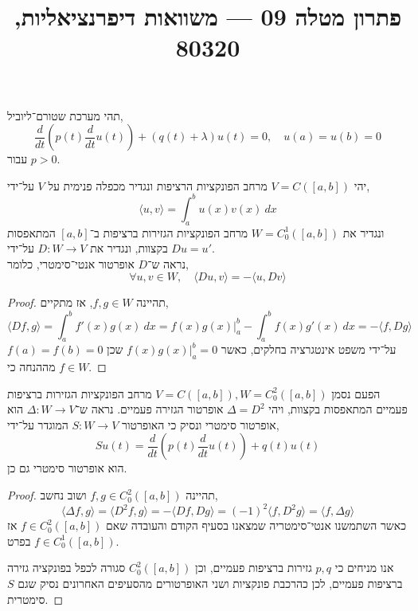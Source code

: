  \title{פתרון מטלה 09 --- משוואות דיפרנציאליות, 80320}

\DeclareMathOperator\Div{div}

\usepackage{pgfplots, tikz, pgffor}
\usetikzlibrary{math}
\pgfplotsset{compat=1.18}


\maketitle
\maketitleprint[blue]{}

\question{}
תהי מערכת שטורם־ליוביל,
\[
	\frac{d}{d t} (p(t) \frac{d}{d t} u(t)) + (q(t) + \lambda) u(t) = 0,
	\quad
	u(a) = u(b) = 0
\]
עבור $p > 0$.

\subquestion{}
יהי $V = C([a, b])$ מרחב הפונקציות הרציפות ונגדיר מכפלה פנימית על $V$ על־ידי,
\[
	\langle u, v \rangle
	= \int_{a}^{b} u(x) v(x)\ dx
\]
ונגדיר את $W = C_0^1([a, b])$ מרחב הפונקציות הגזירות ברציפות ב־$[a, b]$ המתאפסות בקצוות,
ונגדיר את $D : W \to V$ על־ידי $D u = u'$. \\
נראה ש־$D$ אופרטור אנטי־סימטרי, כלומר,
\[
	\forall u, v \in W,
	\quad
	\langle D u, v \rangle
	= - \langle u, D v \rangle
\]
\begin{proof}
	תהיינה $f, g \in W$, אז מתקיים,
	\[
		\langle D f, g \rangle
		= \int_{a}^{b} f'(x) g(x)\ dx
		= \left. f(x) g(x) \right\rvert_a^b - \int_{a}^{b} f(x) g'(x)\ dx
		= - \langle f, D g \rangle
	\]
	על־ידי משפט אינטגרציה בחלקים,
	כאשר $\left. f(x) g(x) \right\rvert_a^b = 0$ שכן $f(a) = f(b) = 0$ מההנחה כי $f \in W$.
\end{proof}

\subquestion{}
הפעם נסמן $V = C([a, b]), W = C_0^2([a, b])$ מרחב הפונקציות הגזירות ברציפות פעמיים המתאפסות בקצוות, ויהי $\Delta = D^2$ אופרטור הגזירה פעמיים.
נראה ש־$\Delta : W \to V$ הוא אופרטור סימטרי ונסיק כי האופרטור $S : W \to V$ המוגדר על־ידי,
\[
	S u(t)
	= \frac{d}{d t} (p(t) \frac{d}{d t}u(t)) + q(t) u(t)
\]
הוא אופרטור סימטרי גם כן.
\begin{proof}
	תהיינה $f, g \in C_0^2([a, b])$ ושוב נחשב,
	\[
		\langle \Delta f, g \rangle
		= \langle D^2 f, g \rangle
		= -\langle D f, D g \rangle
		= {(-1)}^2 \langle f, D^2 g \rangle
		= \langle f, \Delta g \rangle
	\]
	כאשר השתמשנו אנטי־סימטריה שמצאנו בסעיף הקודם והעובדה שאם $f \in C_0^2([a, b])$ אז בפרט $f \in C_0^1([a, b])$.

	אנו מניחים כי $p, q$ גזירות ברציפות פעמיים, וכן $C_0^2([a, b])$ סגורה לכפל בפונקציה גזירה ברציפות פעמיים, לכן כהרכבת פונקציות ושני האופרטורים מהסעיפים האחרונים נסיק שגם $S$ סימטרית.
\end{proof}

